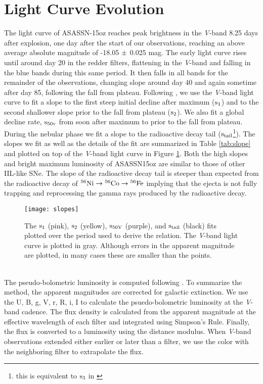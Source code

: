 \documentclass[a4paper,fleqn,usenatbib]{mnras}
\begin{document}
\section{Light Curve Evolution} \label{sec:LCEvolve}
The light curve of ASASSN-15oz reaches peak brightness in the {\it V}-band 8.25 days after explosion, one day after the start of our observations, reaching an above average absolute magnitude of -18.05 $\rm{\pm}$ 0.025 mag.
The early light curve rises until around day 20 in the redder filters, flattening in the {\it V}-band and falling in the blue bands during this same period. 
It then falls in all bands for the remainder of the observations, changing slope around day 40 and again sometime after day 85, following the fall from plateau. 
Following \citet{2014anderson}, we use the {\it V}-band light curve to fit a slope to the first steep initial decline after maximum ($\rm{s_1}$) and to the second shallower slope prior to the fall from plateau ($\rm{s_2}$). 
We also fit a global decline rate, $\rm{s_{50v}}$ from soon after maximum to prior to the fall from plateau.
During the nebular phase we fit a slope to the radioactive decay tail ($\rm{s_{tail}}$\footnote{this is equivalent to $\rm{s_{3}}$ in \citet{2014anderson}}). 
The slopes we fit as well as the details of the fit are summarized in Table \ref{tab:slope} and plotted on top of the {\it V}-band light curve in Figure \ref{fig:slopes}.
Both the high slopes and bright maximum luminosity of ASASSN15oz are similar to those of other IIL-like SNe. 
The slope of the radioactive decay tail is steeper than expected from the radioactive decay of $\rm{{}^{56}Ni \rightarrow {}^{56}Co \rightarrow {}^{56}Fe}$ implying that the ejecta is not fully trapping and reprocessing the gamma rays produced by the radioactive decay.
\begin{figure}
\begin{center}
\texttt{[image: slopes]} %
\caption{The $\rm{s_{1}}$ (pink), $\rm{s_{2}}$ (yellow), $\rm{s_{50V}}$ (purple), and $\rm{ s_{tail}}$ (black) fits plotted over the period used to derive the relation. 
The {\it V}-band light curve is plotted in gray. 
Although errors in the apparent magnitude are plotted, in many cases these are smaller than the points.}
\label{fig:slopes}
\end{center}
\end{figure}\\
\indent The pseudo-bolometric luminosity is computed following \citet{2008valenti}.
To summarize the method, the apparent magnitudes are corrected for galactic extinction.
We use  the U, B, g, V, r, R, i, I to calculate the psuedo-bolometric luminosity at the {\it V}-band cadence.
The flux density is calculated from the apparent magnitude at the effective wavelength of each filter and integrated using Simpson's Rule. 
Finally, the flux is converted to a luminosity using the distance modulus. 
When {\it V}-band observations extended either earlier or later than a filter, we use the color with the neighboring filter to extrapolate the flux.
\end{document}
